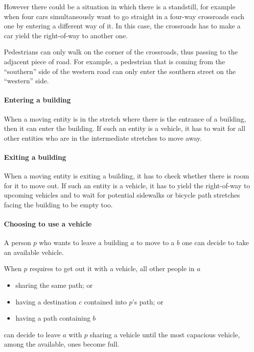 However there could be a situation in which there is a standstill,
for example when four cars simultaneously want to go straight in
a four-way crossroads each one by entering a different way of it.
In this case, the crossroads has to make a car yield the right-of-way
to another one.

Pedestrians can only walk on the corner of the crossroads, thus passing to the
adjacent piece of road. For example, a pedestrian that is coming from
the ``southern'' side of the western road can only enter the southern street
on the ``western'' side.

\paragraph{Entering a building} When a moving entity is in the stretch where
there is the entrance of a building, then it can enter the building.
If such an entity is a vehicle, it has to wait for all other entities who
are in the intermediate stretches to move away.

\paragraph{Exiting a building} When a moving entity is exiting a building, it
has to check whether there is room for it to move out.
If such an entity is a vehicle, it has to yield the right-of-way to
upcoming vehicles and to wait for potential sidewalks or
bicycle path stretches facing the building to be empty too.

\paragraph{Choosing to use a vehicle} A person $p$ who wants to leave a
building $a$ to move to a $b$ one can decide to take an available vehicle.

When $p$ requires to get out it with a vehicle,
all other people in $a$
\begin{itemize}
  \item sharing the same path; or
  \item having a destination $c$ contained into $p$'s path; or
  \item having a path containing $b$
\end{itemize}
can decide to leave $a$ with $p$ sharing a vehicle
until the most capacious vehicle, among the available, ones become full.

